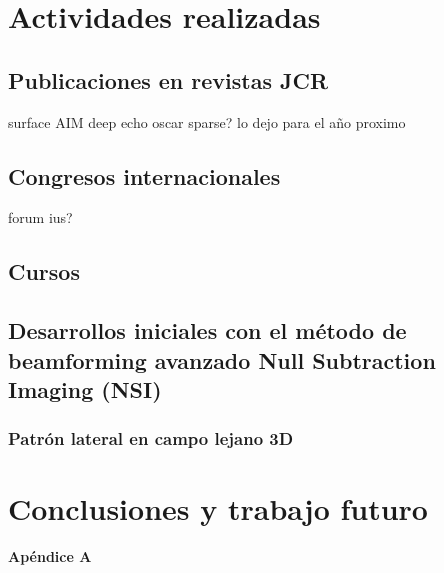 \documentclass[10pt,a4paper]{article}
\begin{document}
\section{Actividades realizadas}\label{sec:actividades}

\subsection{Publicaciones en revistas JCR}\label{sec:publicaciones}
surface AIM
deep echo
oscar sparse? lo dejo para el año proximo 

\subsection{Congresos internacionales}\label{sec:congresos}
forum
ius?

\subsection{Cursos}

\subsection{Desarrollos iniciales con el método de beamforming avanzado Null Subtraction Imaging (NSI)}\label{sec:nsi}
\subsubsection{Patrón lateral en campo lejano 3D}


\section{Conclusiones y trabajo futuro}\label{sec:conclusiones}

\newpage
\appendix

\vspace*{\fill}
\begin{center}
	{\LARGE \textbf{Apéndice A}}
\end{center}
\vspace*{\fill}
\newpage

%
\end{document}
